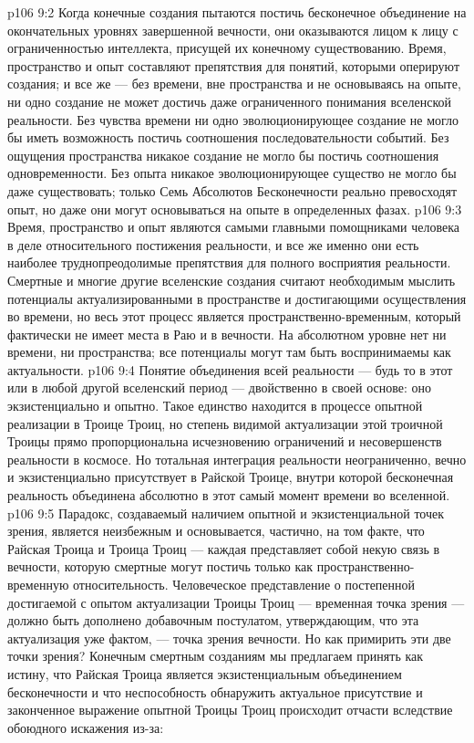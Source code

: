 \vs p106 9:2 Когда конечные создания пытаются постичь бесконечное объединение на окончательных уровнях завершенной вечности, они оказываются лицом к лицу с ограниченностью интеллекта, присущей их конечному существованию. Время, пространство и опыт составляют препятствия для понятий, которыми оперируют создания; и все же --- без времени, вне пространства и не основываясь на опыте, ни одно создание не может достичь даже ограниченного понимания вселенской реальности. Без чувства времени ни одно эволюционирующее создание не могло бы иметь возможность постичь соотношения последовательности событий. Без ощущения пространства никакое создание не могло бы постичь соотношения одновременности. Без опыта никакое эволюционирующее существо не могло бы даже существовать; только Семь Абсолютов Бесконечности реально превосходят опыт, но даже они могут основываться на опыте в определенных фазах.
\vs p106 9:3 Время, пространство и опыт являются самыми главными помощниками человека в деле относительного постижения реальности, и все же именно они есть наиболее труднопреодолимые препятствия для полного восприятия реальности. Смертные и многие другие вселенские создания считают необходимым мыслить потенциалы актуализированными в пространстве и достигающими осуществления во времени, но весь этот процесс является пространственно\hyp{}временным, который фактически не имеет места в Раю и в вечности. На абсолютном уровне нет ни времени, ни пространства; все потенциалы могут там быть воспринимаемы как актуальности.
\vs p106 9:4 Понятие объединения всей реальности --- будь то в этот или в любой другой вселенский период --- двойственно в своей основе: оно экзистенциально и опытно. Такое единство находится в процессе опытной реализации в Троице Троиц, но степень видимой актуализации этой троичной Троицы прямо пропорциональна исчезновению ограничений и несовершенств реальности в космосе. Но тотальная интеграция реальности неограниченно, вечно и экзистенциально присутствует в Райской Троице, внутри которой бесконечная реальность объединена абсолютно в этот самый момент времени во вселенной.
\vs p106 9:5 \pc Парадокс, создаваемый наличием опытной и экзистенциальной точек зрения, является неизбежным и основывается, частично, на том факте, что Райская Троица и Троица Троиц --- каждая представляет собой некую связь в вечности, которую смертные могут постичь только как пространственно\hyp{}временную относительность. Человеческое представление о постепенной достигаемой с опытом актуализации Троицы Троиц --- временная точка зрения --- должно быть дополнено добавочным постулатом, утверждающим, что эта актуализация уже  фактом, --- точка зрения вечности. Но как примирить эти две точки зрения? Конечным смертным созданиям мы предлагаем принять как истину, что Райская Троица является экзистенциальным объединением бесконечности и что неспособность обнаружить актуальное присутствие и законченное выражение опытной Троицы Троиц происходит отчасти вследствие обоюдного искажения из\hyp{}за:
